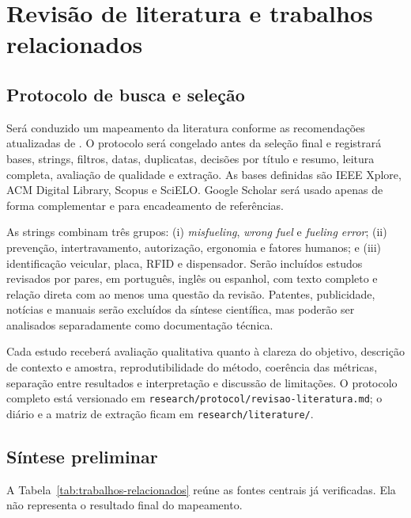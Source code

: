 \section{Revisão de literatura e trabalhos relacionados}
\label{sec:revisao}

\subsection{Protocolo de busca e seleção}

Será conduzido um mapeamento da literatura conforme as recomendações atualizadas
de \cite{petersenEtAl2015}. O protocolo será congelado antes da seleção final e
registrará bases, strings, filtros, datas, duplicatas, decisões por título e
resumo, leitura completa, avaliação de qualidade e extração. As bases definidas
são IEEE Xplore, ACM Digital Library, Scopus e SciELO. Google Scholar será usado
apenas de forma complementar e para encadeamento de referências.

As strings combinam três grupos: (i) \textit{misfueling}, \textit{wrong fuel} e
\textit{fueling error}; (ii) prevenção, intertravamento, autorização, ergonomia
e fatores humanos; e (iii) identificação veicular, placa, RFID e dispensador.
Serão incluídos estudos revisados por pares, em português, inglês ou espanhol,
com texto completo e relação direta com ao menos uma questão da revisão.
Patentes, publicidade, notícias e manuais serão excluídos da síntese científica,
mas poderão ser analisados separadamente como documentação técnica.

Cada estudo receberá avaliação qualitativa quanto à clareza do objetivo,
descrição de contexto e amostra, reprodutibilidade do método, coerência das
métricas, separação entre resultados e interpretação e discussão de limitações.
O protocolo completo está versionado em
\texttt{research/protocol/revisao-literatura.md}; o diário e a matriz de extração
ficam em \texttt{research/literature/}.


\subsection{Síntese preliminar}

A Tabela~\ref{tab:trabalhos-relacionados} reúne as fontes centrais já
verificadas. Ela não representa o resultado final do mapeamento.


